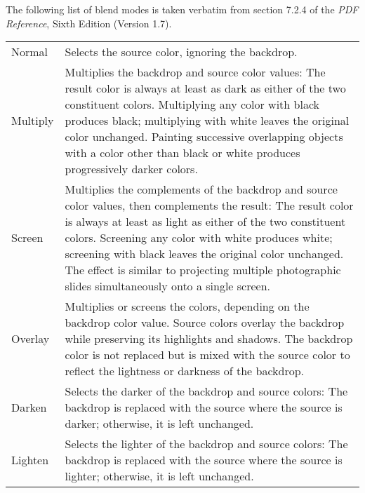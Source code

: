 \documentclass{article}
\begin{document}
\noindent The following list of blend modes  is taken verbatim from section
7.2.4 of the \textsl{PDF Reference}, Sixth Edition (Version 1.7).

\noindent\hfill\begin{longtable}{>{\ttfamily}lp{3.5in}}
Normal    & Selects the source color, ignoring the backdrop.
\\[3pt]
Multiply  &  Multiplies the backdrop and source color values: The
            result color is always at least as dark as either of the two
            constituent colors. Multiplying any color with black produces black;
            multiplying with white leaves the original color unchanged. Painting
            successive overlapping objects with a color other than black or
            white produces progressively darker colors.
\\[3pt]

Screen    & Multiplies the complements of the backdrop and source
            color values, then complements the result: The result color is
            always at least as light as either of the two constituent colors.
            Screening any color with white produces white; screening with black
            leaves the original color unchanged. The effect is similar to
            projecting multiple photographic slides simultaneously onto a single
            screen.
\\[3pt]
Overlay   & Multiplies or screens the colors, depending on the
            backdrop color value. Source colors overlay the backdrop while
            preserving its highlights and shadows. The backdrop color is not
            replaced but is mixed with the source color to reflect the lightness
            or darkness of the backdrop.
\\[3pt]

Darken    & Selects the darker of the backdrop and source colors:
            The backdrop is replaced with the source where the
            source is darker; otherwise, it is left unchanged.
\\[3pt]

Lighten   & Selects the lighter of the backdrop and source colors:
            The backdrop is replaced with the source where the
            source is lighter; otherwise, it is left unchanged.
\\[3pt]


\end{longtable}
\end{document}
